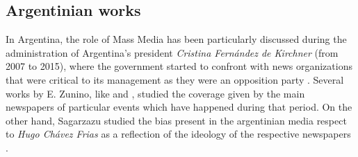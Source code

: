 
\subsection{Argentinian works}

\par In Argentina, the role of Mass Media has been particularly discussed during the administration of Argentina’s president \emph{Cristina Fernández de Kirchner} (from 2007 to 2015), where the government started to confront with news organizations that were critical to its management as they were an opposition party \cite{mitchelstein2017information}. Several works by E. Zunino, like \cite{zunino2010cobertura} and \cite{koziner2013cobertura}, studied the coverage given by the main newspapers of particular events which have happened during that period. 
On the other hand, Sagarzazu studied the bias present in the argentinian media respect to \emph{Hugo Chávez Frias} as a reflection of the ideology of the respective newspapers  \cite{sagarzazu2017hugo}. 
